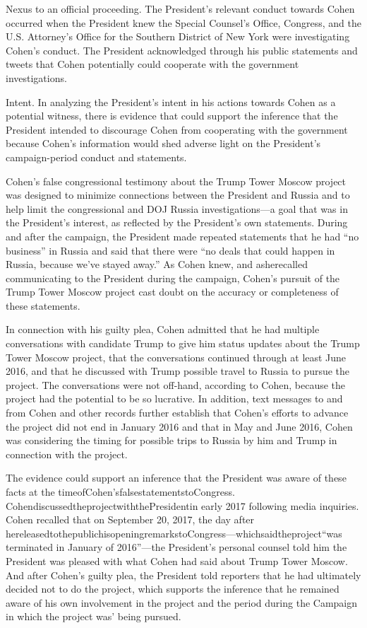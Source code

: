 {Nexus to an official proceeding. The President's relevant conduct towards Cohen occurred when the President knew the Special Counsel's Office, Congress, and the U.S. Attorney's Office for the Southern District of New York were investigating Cohen's conduct. The President acknowledged through his public statements and tweets that Cohen potentially could cooperate with the government investigations.

Intent. In analyzing the President's intent in his actions towards Cohen as a potential witness, there is evidence that could support the inference that the President intended to discourage Cohen from cooperating with the government because Cohen's information would shed adverse light on the President's campaign-period conduct and statements.

Cohen's false congressional testimony about the Trump Tower Moscow project was designed to minimize connections between the President and Russia and to help limit the congressional and DOJ Russia investigations—a goal that was in the President's interest, as reflected by the President's own statements. During and after the campaign, the President made repeated statements that he had “no business” in Russia and said that there were “no deals that could happen in Russia, because we've stayed away.” As Cohen knew, and asherecalled communicating to the President during the campaign, Cohen's pursuit of the Trump Tower Moscow project cast doubt on the accuracy or completeness of these statements.

In connection with his guilty plea, Cohen admitted that he had multiple conversations with candidate Trump to give him status updates about the Trump Tower Moscow project, that the conversations continued through at least June 2016, and that he discussed with Trump possible travel to Russia to pursue the project. The conversations were not off-hand, according to Cohen, because the project had the potential to be so lucrative. In addition, text messages to and from Cohen and other records further establish that Cohen's efforts to advance the project did not end in January 2016 and that in May and June 2016, Cohen was considering the timing for possible trips to Russia by him and Trump in connection with the project.

The evidence could support an inference that the President was aware of these facts at the timeofCohen'sfalsestatementstoCongress. CohendiscussedtheprojectwiththePresidentin early 2017 following media inquiries. Cohen recalled that on September 20, 2017, the day after hereleasedtothepublichisopeningremarkstoCongress—whichsaidtheproject“was terminated in January of 2016”—the President's personal counsel told him the President was pleased with what Cohen had said about Trump Tower Moscow. And after Cohen's guilty plea, the President told reporters that he had ultimately decided not to do the project, which supports the inference that he remained aware of his own involvement in the project and the period during the Campaign in which the project was' being pursued.

}
